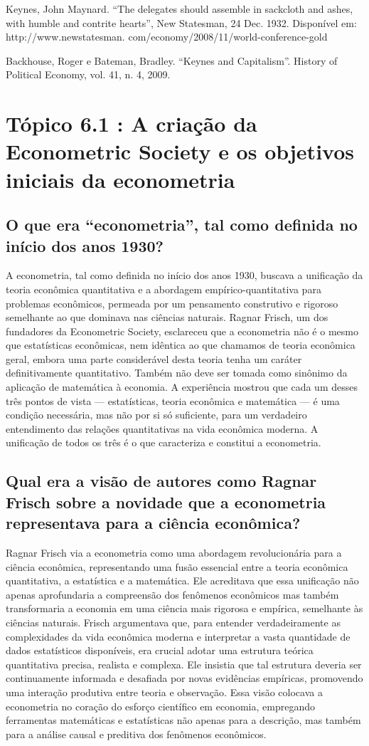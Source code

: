 \documentclass[a4paper,12pt]{article}[abntex2]
\begin{document}
Keynes, John Maynard. “The delegates should assemble in sackcloth and ashes, with humble
and contrite hearts”, New Statesman, 24 Dec. 1932. Disponível em: http://www.newstatesman.
com/economy/2008/11/world-conference-gold

Backhouse, Roger e Bateman, Bradley. “Keynes and Capitalism”. History of Political Economy,
vol. 41, n. 4, 2009.

\section{\textbf{Tópico 6.1 : A criação da Econometric Society e os objetivos iniciais da econometria}}
\subsection{\textbf{O que era “econometria”, tal como definida no início dos anos 1930?}}
A econometria, tal como definida no início dos anos 1930, buscava a unificação da teoria econômica quantitativa e a abordagem empírico-quantitativa para problemas econômicos, permeada por um pensamento construtivo e rigoroso semelhante ao que dominava nas ciências naturais. Ragnar Frisch, um dos fundadores da Econometric Society, esclareceu que a econometria não é o mesmo que estatísticas econômicas, nem idêntica ao que chamamos de teoria econômica geral, embora uma parte considerável desta teoria tenha um caráter definitivamente quantitativo. Também não deve ser tomada como sinônimo da aplicação de matemática à economia. A experiência mostrou que cada um desses três pontos de vista — estatísticas, teoria econômica e matemática — é uma condição necessária, mas não por si só suficiente, para um verdadeiro entendimento das relações quantitativas na vida econômica moderna. A unificação de todos os três é o que caracteriza e constitui a econometria.

\subsection{\textbf{Qual era a visão de autores como Ragnar Frisch sobre a novidade que a econometria representava para a ciência econômica?}}
Ragnar Frisch via a econometria como uma abordagem revolucionária para a ciência econômica, representando uma fusão essencial entre a teoria econômica quantitativa, a estatística e a matemática. Ele acreditava que essa unificação não apenas aprofundaria a compreensão dos fenômenos econômicos mas também transformaria a economia em uma ciência mais rigorosa e empírica, semelhante às ciências naturais. Frisch argumentava que, para entender verdadeiramente as complexidades da vida econômica moderna e interpretar a vasta quantidade de dados estatísticos disponíveis, era crucial adotar uma estrutura teórica quantitativa precisa, realista e complexa. Ele insistia que tal estrutura deveria ser continuamente informada e desafiada por novas evidências empíricas, promovendo uma interação produtiva entre teoria e observação. Essa visão colocava a econometria no coração do esforço científico em economia, empregando ferramentas matemáticas e estatísticas não apenas para a descrição, mas também para a análise causal e preditiva dos fenômenos econômicos.
\end{document}

